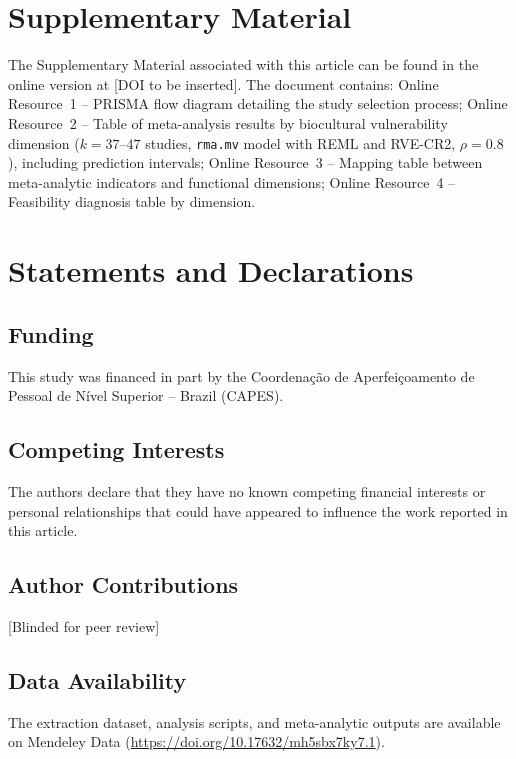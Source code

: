 \documentclass[12pt,a4paper]{article}
\begin{document}
\section*{Supplementary Material}

The Supplementary Material associated with this article can be found in the online version at [DOI to be inserted]. The document contains: Online Resource~1 -- PRISMA flow diagram detailing the study selection process; Online Resource~2 -- Table of meta-analysis results by biocultural vulnerability dimension ($k = 37$--$47$ studies, \texttt{rma.mv} model with REML and RVE-CR2, $\rho = 0.8$), including prediction intervals; Online Resource~3 -- Mapping table between meta-analytic indicators and functional dimensions; Online Resource~4 -- Feasibility diagnosis table by dimension.




\section*{Statements and Declarations}

\subsection*{Funding}

This study was financed in part by the Coordena\c{c}\~ao de Aperfei\c{c}oamento de Pessoal de N\'ivel Superior -- Brazil (CAPES).

\subsection*{Competing Interests}

The authors declare that they have no known competing financial interests or personal relationships that could have appeared to influence the work reported in this article.

\subsection*{Author Contributions}

[Blinded for peer review]

\subsection*{Data Availability}

The extraction dataset, analysis scripts, and meta-analytic outputs are available on Mendeley Data (\url{https://doi.org/10.17632/mh5sbx7ky7.1}).
\end{document}
